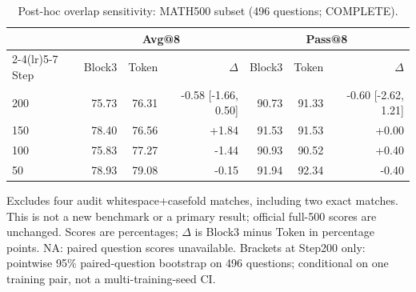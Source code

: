 \begin{table}[t]
\centering
\scriptsize
\setlength{\tabcolsep}{4pt}
\caption{Post-hoc overlap sensitivity: MATH500 subset (496 questions; COMPLETE).}
\label{tab:qwen4overlapsensitivity}
\begin{tabular}{lrrrrrr}
\toprule
 & \multicolumn{3}{c}{Avg@8} & \multicolumn{3}{c}{Pass@8} \\
\cmidrule(lr){2-4}\cmidrule(lr){5-7}
Step & Block3 & Token & $\Delta$ & Block3 & Token & $\Delta$ \\
\midrule
200 & 75.73 & 76.31 & -0.58 [-1.66, 0.50] & 90.73 & 91.33 & -0.60 [-2.62, 1.21] \\
150 & 78.40 & 76.56 & +1.84 & 91.53 & 91.53 & +0.00 \\
100 & 75.83 & 77.27 & -1.44 & 90.93 & 90.52 & +0.40 \\
50 & 78.93 & 79.08 & -0.15 & 91.94 & 92.34 & -0.40 \\
\bottomrule
\end{tabular}
\par\smallskip\footnotesize Excludes four audit whitespace+casefold matches, including two exact matches. This is not a new benchmark or a primary result; official full-500 scores are unchanged. Scores are percentages; $\Delta$ is Block3 minus Token in percentage points. NA: paired question scores unavailable. Brackets at Step200 only: pointwise 95\% paired-question bootstrap on 496 questions; conditional on one training pair, not a multi-training-seed CI.
\end{table}
